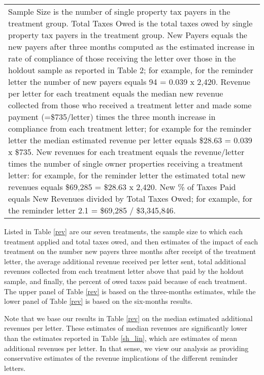 \documentclass[12pt]{article}
\begin{document}
\begin{table}[htbp]
\begin{tabular}{lcccccc}
\multicolumn{7}{p{1\textwidth}}{\scriptsize* Sample Size is the number of single property tax payers in the treatment group.  Total Taxes Owed is the total taxes owed by single property tax payers in the treatment group. New Payers equals the new payers after three months computed as the estimated increase in rate of compliance of those receiving the letter over those in the holdout sample as reported in Table 2; for example, for the reminder letter the number of new payers equals 94 = 0.039 x 2,420.  Revenue per letter for each treatment equals the median new revenue collected from those who received a treatment letter and made some payment (=\$735/letter) times the three month increase in compliance from each treatment letter; for example for the reminder letter the median estimated revenue per letter equals \$28.63 = 0.039 x \$735.  New revenues for each treatment equals the revenue/letter times the number of single owner properties receiving a treatment letter: for example, for the reminder letter the estimated total new revenues equals \$69,285 = \$28.63 x 2,420.  New \% of Taxes Paid equals New Revenues divided by Total Taxes Owed; for example, for the reminder letter 2.1 = \$69,285 / \$3,345,846.}
  \end{tabular}
\end{table}

Listed in Table \ref{rev} are our seven treatments, the sample size to
which each treatment applied and total taxes owed, and then estimates
of the impact of each treatment on the number new payers three months
after receipt of the treatment letter, the average additional revenue
received per letter sent, total additional revenues collected from each
treatment letter above that paid by the holdout sample, and finally,
the percent of owed taxes paid because of each treatment.  The upper
panel of Table \ref{rev} is based on the three-months estimates, while
the lower panel of Table \ref{rev} is based on the six-months results.

Note that we base our results in Table \ref{rev} on the median
estimated additional revenues per letter. These estimates of median
revenues are significantly lower than the estimates reported in Table
\ref{sh_lin}, which are estimates of mean additional revenues per
letter.  In that sense, we view our analysis  as providing
conservative estimates of the revenue implications of the different
reminder letters.
\end{document}

